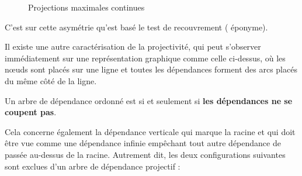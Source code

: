 \begin{figure}
\caption{\label{fig:}Projections maximales continues}
\end{figure}

C’est sur cette asymétrie qu’est basé le test de recouvrement ( éponyme).

Il existe une autre caractérisation de la projectivité, qui peut s’observer immédiatement sur une représentation graphique comme celle ci-dessus, où les nœuds sont placés sur une ligne et toutes les dépendances forment des arcs placés du même côté de la ligne.

{Un arbre de dépendance ordonné est  si et seulement si \textbf{les dépendances ne se coupent pas}.}

Cela concerne également la dépendance verticale qui marque la racine et qui doit être vue comme une dépendance infinie empêchant tout autre dépendance de passée au-dessus de la racine. Autrement dit, les deux configurations suivantes sont exclues d’un arbre de dépendance projectif :

